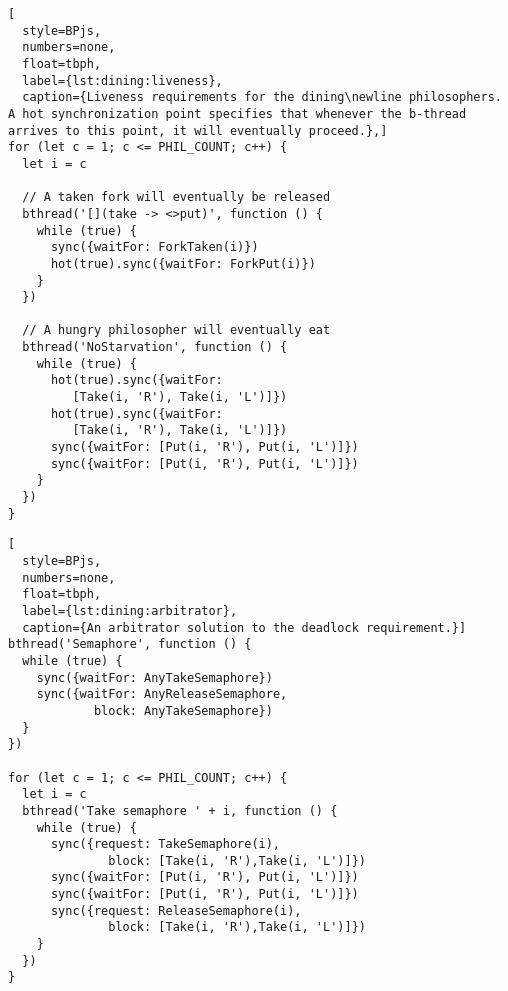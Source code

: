 \documentclass[10pt,journal,compsoc]{IEEEtran}
\theoremstyle{definition}
\begin{document}
\begin{lstlisting}[
  style=BPjs,
  numbers=none,
  float=tbph,
  label={lst:dining:liveness},
  caption={Liveness requirements for the dining\newline philosophers. A hot synchronization point specifies that whenever the b-thread arrives to this point, it will eventually proceed.},]
for (let c = 1; c <= PHIL_COUNT; c++) {
  let i = c

  // A taken fork will eventually be released
  bthread('[](take -> <>put)', function () {
    while (true) {
      sync({waitFor: ForkTaken(i)})
      hot(true).sync({waitFor: ForkPut(i)})
    }
  })

  // A hungry philosopher will eventually eat
  bthread('NoStarvation', function () {
    while (true) {
      hot(true).sync({waitFor: 
         [Take(i, 'R'), Take(i, 'L')]})
      hot(true).sync({waitFor: 
         [Take(i, 'R'), Take(i, 'L')]})
      sync({waitFor: [Put(i, 'R'), Put(i, 'L')]})
      sync({waitFor: [Put(i, 'R'), Put(i, 'L')]})
    }
  })
}
\end{lstlisting}

\begin{lstlisting}[
  style=BPjs,
  numbers=none,
  float=tbph,
  label={lst:dining:arbitrator},
  caption={An arbitrator solution to the deadlock requirement.}]
bthread('Semaphore', function () {
  while (true) {
    sync({waitFor: AnyTakeSemaphore})
    sync({waitFor: AnyReleaseSemaphore, 
            block: AnyTakeSemaphore})
  }
})

for (let c = 1; c <= PHIL_COUNT; c++) {
  let i = c
  bthread('Take semaphore ' + i, function () {
    while (true) {
      sync({request: TakeSemaphore(i), 
              block: [Take(i, 'R'),Take(i, 'L')]})
      sync({waitFor: [Put(i, 'R'), Put(i, 'L')]})
      sync({waitFor: [Put(i, 'R'), Put(i, 'L')]})
      sync({request: ReleaseSemaphore(i), 
              block: [Take(i, 'R'),Take(i, 'L')]})
    }
  })
}
\end{lstlisting}
\end{document}
